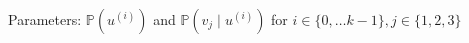 \documentclass[preview]{standalone}
\begin{document}
\begin{center}
Parameters: $\mathbb{P}(u^{(i)})$ and $\mathbb{P}( v_j \; | \; u^{(i)})$ for $i \in \{0,\ldots k-1\}, j \in \{1,2,3\}$
\end{center}
\end{document}
